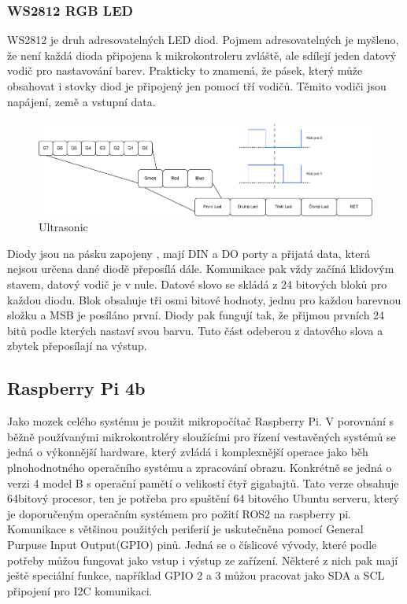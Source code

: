 \subsubsection*{WS2812 RGB LED} %
WS2812 je druh adresovatelných LED diod. Pojmem adresovatelných je myšleno, že není každá dioda připojena k mikrokontroleru zvláště, ale sdílejí jeden datový vodič pro nastavování barev. Prakticky to znamená, že pásek, který může obsahovat i stovky diod je připojený jen pomocí tří vodičů. Těmito vodiči jsou napájení, země a vstupní data.

\begin{figure}[h!]
	\centering
	\includegraphics[scale=0.55]{obrazky-figures/ws2812_led.pdf}
	\caption{Ultrasonic}
	\label{}
\end{figure}

Diody jsou na pásku zapojeny , mají DIN a DO porty a přijatá data, která nejsou určena dané diodě přeposílá dále. Komunikace pak vždy začíná klidovým stavem, datový vodič je v nule. Datové slovo se skládá z 24 bitových bloků pro každou diodu. Blok obsahuje tři osmi bitové hodnoty, jednu pro každou barevnou složku a MSB je posíláno první. Diody pak fungují tak, že přijmou prvních 24 bitů podle kterých nastaví svou barvu. Tuto část odeberou z datového slova a zbytek přeposílají na výstup.

\subsection*{Raspberry Pi 4b}
Jako mozek celého systému je použit mikropočítač Raspberry Pi. V porovnání s běžně používanými mikrokontroléry sloužícími pro řízení vestavěných systémů se jedná o výkonnější hardware, který zvládá i komplexnější operace jako běh plnohodnotného operačního systému a zpracování obrazu. Konkrétně se jedná o verzi 4 model B s operační pamětí o velikostí čtyř gigabajtů. Tato verze obsahuje 64bitový procesor, ten je potřeba pro spuštění 64 bitového Ubuntu serveru, který je doporučeným operačním systémem pro požití ROS2 na raspberry pi.
Komunikace s většinou použitých periferií je uskutečněna pomocí General Purpuse Input Output(GPIO) pinů. Jedná se o číslicové vývody, které podle potřeby můžou fungovat jako vstup i výstup ze zařízení. Některé z nich pak mají ještě speciální funkce, například GPIO 2 a 3 můžou pracovat jako SDA a SCL připojení pro I2C komunikaci.

